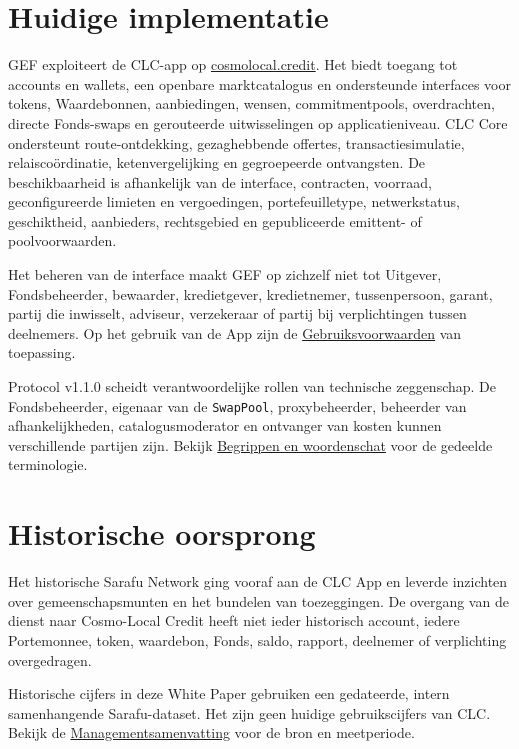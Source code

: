 \documentclass[11pt]{article}
\begin{document}
\section*{Huidige implementatie}

GEF exploiteert de CLC-app op \href{https://cosmolocal.credit}{cosmolocal.credit}. Het biedt toegang tot accounts en wallets, een openbare marktcatalogus en ondersteunde interfaces voor tokens, Waardebonnen, aanbiedingen, wensen, commitmentpools, overdrachten, directe Fonds-swaps en gerouteerde uitwisselingen op applicatieniveau. CLC Core ondersteunt route-ontdekking, gezaghebbende offertes, transactiesimulatie, relaiscoördinatie, ketenvergelijking en gegroepeerde ontvangsten. De beschikbaarheid is afhankelijk van de interface, contracten, voorraad, geconfigureerde limieten en vergoedingen, portefeuilletype, netwerkstatus, geschiktheid, aanbieders, rechtsgebied en gepubliceerde emittent- of poolvoorwaarden.

Het beheren van de interface maakt GEF op zichzelf niet tot Uitgever, Fondsbeheerder, bewaarder, kredietgever, kredietnemer, tussenpersoon, garant, partij die inwisselt, adviseur, verzekeraar of partij bij verplichtingen tussen deelnemers. Op het gebruik van de App zijn de \href{https://docs.cosmolocal.credit/nl/governance/terms}{Gebruiksvoorwaarden} van toepassing.

Protocol v1.1.0 scheidt verantwoordelijke rollen van technische zeggenschap. De Fondsbeheerder, eigenaar van de \texttt{SwapPool}, proxybeheerder, beheerder van afhankelijkheden, catalogusmoderator en ontvanger van kosten kunnen verschillende partijen zijn. Bekijk \href{https://docs.cosmolocal.credit/nl/introduction/concepts}{Begrippen en woordenschat} voor de gedeelde terminologie.

\section*{Historische oorsprong}

Het historische Sarafu Network ging vooraf aan de CLC App en leverde inzichten over gemeenschapsmunten en het bundelen van toezeggingen. De overgang van de dienst naar Cosmo-Local Credit heeft niet ieder historisch account, iedere Portemonnee, token, waardebon, Fonds, saldo, rapport, deelnemer of verplichting overgedragen.

Historische cijfers in deze White Paper gebruiken een gedateerde, intern samenhangende Sarafu-dataset. Het zijn geen huidige gebruikscijfers van CLC. Bekijk de \href{https://docs.cosmolocal.credit/nl/white-paper/executive-summary}{Managementsamenvatting} voor de bron en meetperiode.
\end{document}

